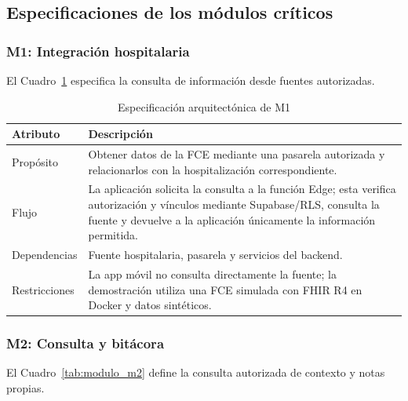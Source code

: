 \subsection{Especificaciones de los módulos críticos}

\subsubsection*{M1: Integración hospitalaria}

El Cuadro~\ref{tab:modulo_m1} especifica la consulta de información desde fuentes autorizadas.

\begin{table}[H]
    \caption{Especificación arquitectónica de M1}
    \label{tab:modulo_m1}
    \begin{tabularx}{\textwidth}{|l|X|}
        \hline
        \textbf{Atributo} & \textbf{Descripción} \\
        \hline
        Propósito & Obtener datos de la FCE mediante una pasarela autorizada y relacionarlos con la hospitalización correspondiente. \\
        \hline
        Flujo & La aplicación solicita la consulta a la función Edge; esta verifica autorización y vínculos mediante Supabase/RLS, consulta la fuente y devuelve a la aplicación únicamente la información permitida. \\
        \hline
        Dependencias & Fuente hospitalaria, pasarela y servicios del backend. \\
        \hline
        Restricciones & La app móvil no consulta directamente la fuente; la demostración utiliza una FCE simulada con FHIR R4 en Docker y datos sintéticos. \\
        \hline
    \end{tabularx}
\end{table}

\subsubsection*{M2: Consulta y bitácora}

El Cuadro~\ref{tab:modulo_m2} define la consulta autorizada de contexto y notas propias.

